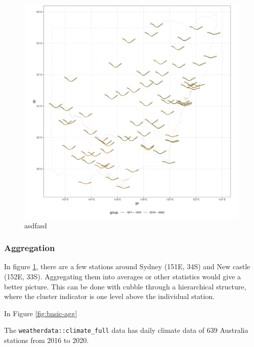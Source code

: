\documentclass[
]{jss}
\begin{document}
\begin{CodeChunk}
\begin{figure}

{\centering \includegraphics[width=1\linewidth,height=0.7\textheight]{figures/basic-manip} 

}

\caption[asdfasd]{asdfasd}\label{fig:basic-manip}
\end{figure}
\end{CodeChunk}

\hypertarget{aggregation}{%
\subsubsection{Aggregation}\label{aggregation}}

In figure \ref{fig:basic-manip}, there are a few stations around Sydney
(151E, 34S) and New castle (152E, 33S). Aggregating them into averages
or other statistics would give a better picture. This can be done with
cubble through a hierarchical structure, where the cluster indicator is
one level above the individual station.

In Figure \ref{fig:basic-agg}

The \texttt{weatherdata::climate\_full} data has daily climate data of
639 Australia stations from 2016 to 2020.
\end{document}
